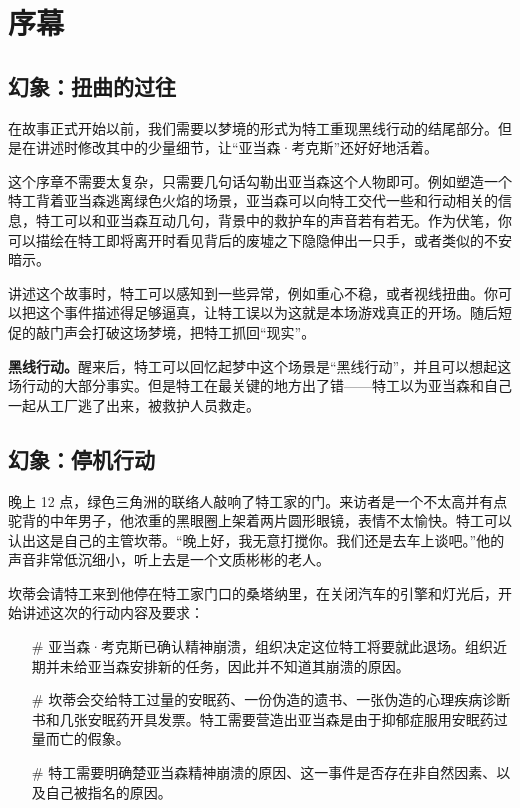 \section{序幕}

\subsection{幻象：扭曲的过往}

在故事正式开始以前，我们需要以梦境的形式为特工重现黑线行动的结尾部分。但是在讲述时修改其中的少量细节，让“亚当森·考克斯”还好好地活着。

这个序章不需要太复杂，只需要几句话勾勒出亚当森这个人物即可。例如塑造一个特工背着亚当森逃离绿色火焰的场景，亚当森可以向特工交代一些和行动相关的信息，特工可以和亚当森互动几句，背景中的救护车的声音若有若无。作为伏笔，你可以描绘在特工即将离开时看见背后的废墟之下隐隐伸出一只手，或者类似的不安暗示。

讲述这个故事时，特工可以感知到一些异常，例如重心不稳，或者视线扭曲。你可以把这个事件描述得足够逼真，让特工误以为这就是本场游戏真正的开场。随后短促的敲门声会打破这场梦境，把特工抓回“现实”。

\textbf{黑线行动。}醒来后，特工可以回忆起梦中这个场景是“黑线行动”，并且可以想起这场行动的大部分事实。但是特工在最关键的地方出了错——特工以为亚当森和自己一起从工厂逃了出来，被救护人员救走。

\subsection{幻象：停机行动}
晚上 12 点，绿色三角洲的联络人敲响了特工家的门。来访者是一个不太高并有点驼背的中年男子，他浓重的黑眼圈上架着两片圆形眼镜，表情不太愉快。特工可以认出这是自己的主管坎蒂。“晚上好，我无意打搅你。我们还是去车上谈吧。”他的声音非常低沉细小，听上去是一个文质彬彬的老人。

坎蒂会请特工来到他停在特工家门口的桑塔纳里，在关闭汽车的引擎和灯光后，开始讲述这次的行动内容及要求：

\begin{itemize}
    \item[\#] 亚当森·考克斯已确认精神崩溃，组织决定这位特工将要就此退场。组织近期并未给亚当森安排新的任务，因此并不知道其崩溃的原因。
    \item[\#] 坎蒂会交给特工过量的安眠药、一份伪造的遗书、一张伪造的心理疾病诊断书和几张安眠药开具发票。特工需要营造出亚当森是由于抑郁症服用安眠药过量而亡的假象。
    \item[\#] 特工需要明确楚亚当森精神崩溃的原因、这一事件是否存在非自然因素、以及自己被指名的原因。
\end{itemize}

